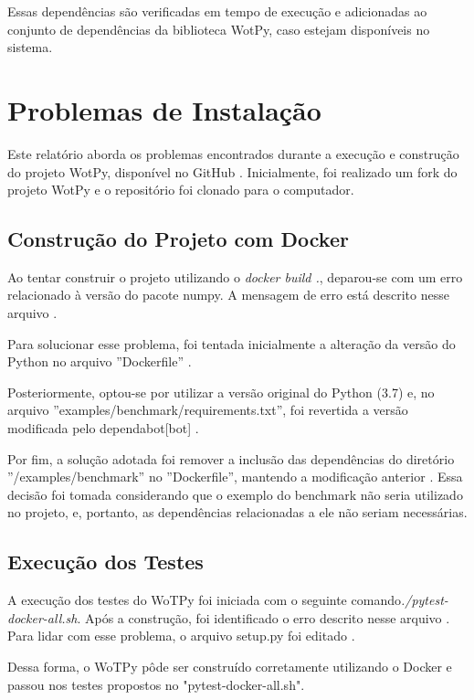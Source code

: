 Essas dependências são verificadas em tempo de execução e adicionadas ao conjunto de dependências da biblioteca WotPy, caso estejam disponíveis no sistema.

\section{Problemas de Instalação}

Este relatório aborda os problemas encontrados durante a execução e construção do projeto WotPy, disponível no GitHub \cite{gitwotpy:2022}. Inicialmente, foi realizado um fork do projeto WotPy e o repositório  foi clonado para o computador. 

\subsection{Construção do Projeto com Docker}

Ao tentar construir o projeto utilizando o \textit{docker build .}, deparou-se com um erro relacionado à versão do pacote numpy. A mensagem de erro está descrito nesse arquivo \cite{gitwotpy:cpd}.

Para solucionar esse problema, foi tentada inicialmente a alteração da versão do Python no arquivo ''Dockerfile'' \cite{gitwotpy:v1}.

Posteriormente, optou-se por utilizar a versão original do Python (3.7) e, no arquivo ''examples/benchmark/requirements.txt'', foi revertida a versão modificada pelo dependabot[bot] \cite{gitwotpy:bot} \cite{gitwotpy:v2}.

Por fim, a solução adotada foi remover a inclusão das dependências do diretório ''/examples/benchmark'' no ''Dockerfile'', mantendo a modificação anterior \cite{gitwotpy:v5}. Essa decisão foi tomada considerando que o exemplo do benchmark não seria utilizado no projeto, e, portanto, as dependências relacionadas a ele não seriam necessárias.

\subsection{Execução dos Testes}

A execução dos testes do WoTPy foi iniciada com o seguinte comando\textit{./pytest-docker-all.sh}. Após a construção, foi identificado o erro descrito nesse arquivo \cite{gitwotpy:et}. Para lidar com esse problema, o arquivo setup.py foi editado \cite{gitwotpy:v1}.

Dessa forma, o WoTPy pôde ser construído corretamente utilizando o Docker e passou nos testes propostos no "pytest-docker-all.sh".

